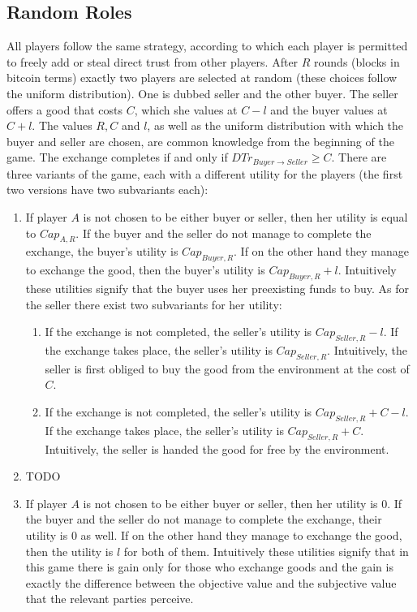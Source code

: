 \subsection{Random Roles}
  All players follow the same strategy, according to which each player is permitted to freely add or steal direct trust from
  other players. After $R$ rounds (blocks in bitcoin terms) exactly two players are selected at random (these choices follow
  the uniform distribution). One is dubbed seller and the other buyer. The seller offers a good that costs $C$, which she
  values at $C - l$ and the buyer values at $C + l$. The values $R, C$ and $l$, as well as the uniform distribution with which
  the buyer and seller are chosen, are common knowledge from the beginning of the game. The exchange completes if and only if
  $DTr_{Buyer \rightarrow Seller} \geq C$. There are three variants of the game, each with a different utility for the
  players (the first two versions have two subvariants each):

  \begin{enumerate}
    \item If player $A$ is not chosen to be either buyer or seller, then her utility is equal to $Cap_{A, R}$. If the buyer
    and the seller do not manage to complete the exchange, the buyer's utility is $Cap_{Buyer, R}$. If on the other hand they
    manage to exchange the good, then the buyer's utility is $Cap_{Buyer, R} + l$. Intuitively these utilities signify
    that the buyer uses her preexisting funds to buy. As for the seller there exist two subvariants for her utility:
    \begin{enumerate}
      \item If the exchange is not completed, the seller's utility is $Cap_{Seller, R} - l$. If the exchange takes place, the
      seller's utility is $Cap_{Seller, R}$. Intuitively, the seller is first obliged to buy the good from the environment at
      the cost of $C$.

      \item If the exchange is not completed, the seller's utility is $Cap_{Seller, R} + C - l$. If the exchange takes place, the
      seller's utility is $Cap_{Seller, R} + C$. Intuitively, the seller is handed the good for free by the environment.
    \end{enumerate}
    
    \item TODO

    \item If player $A$ is not chosen to be either buyer or seller, then her utility is 0. If the buyer and the seller do not
    manage to complete the exchange, their utility is 0 as well. If on the other hand they manage to exchange the good, then
    the utility is $l$ for both of them. Intuitively these utilities signify that in this game there is gain only for those
    who exchange goods and the gain is exactly the difference between the objective value and the subjective value that the
    relevant parties perceive.
  \end{enumerate}

